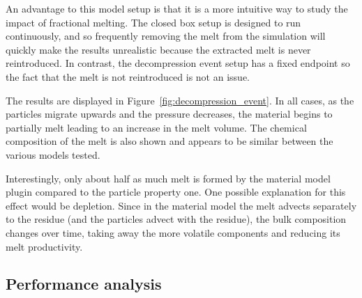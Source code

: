 An advantage to this model setup is that it is a more intuitive way to study the impact of fractional melting.
The closed box setup is designed to run continuously, and so frequently removing the melt from the simulation will quickly make the results unrealistic because the extracted melt is never reintroduced.
In contrast, the decompression event setup has a fixed endpoint so the fact that the melt is not reintroduced is not an issue.

The results are displayed in Figure~\ref{fig:decompression_event}.
In all cases, as the particles migrate upwards and the pressure decreases, the material begins to partially melt leading to an increase in the melt volume.
The chemical composition of the melt is also shown and appears to be similar between the various models tested.

Interestingly, only about half as much melt is formed by the material model plugin compared to the particle property one.
One possible explanation for this effect would be depletion.
Since in the material model the melt advects separately to the residue (and the particles advect with the residue), the bulk composition changes over time, taking away the more volatile components and reducing its melt productivity.

\subsection{Performance analysis}

